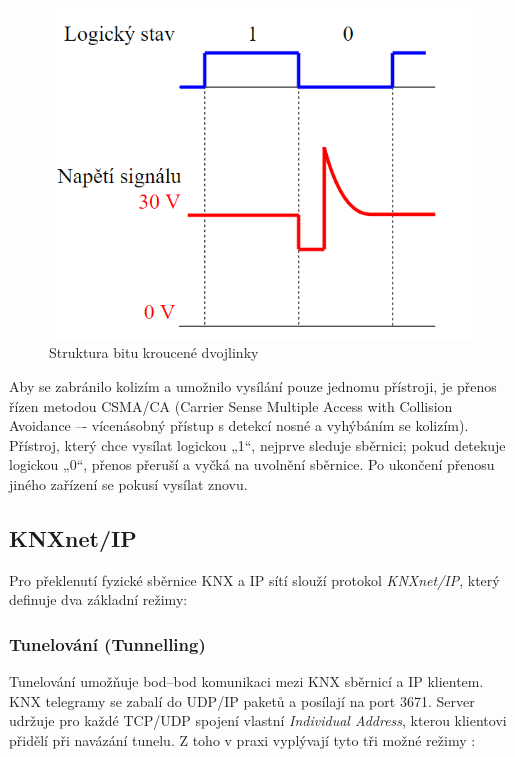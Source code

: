 \begin{figure}[!h]
  \begin{center}
    \includegraphics[scale=0.7]{obrazky/Struktura bitu.png}
  \end{center}
  \caption[Struktura bitu kroucené dvojlinky \cite{Celkovy prehled}]{Struktura bitu kroucené dvojlinky \cite{Celkovy prehled}}
  \label{fig:Struktura bitu kroucené dvojlinky}
\end{figure}

Aby se zabránilo kolizím a umožnilo vysílání pouze jednomu přístroji, je přenos řízen metodou CSMA/CA (Carrier Sense Multiple Access with Collision Avoidance –- vícenásobný přístup s detekcí nosné a vyhýbáním se kolizím). Přístroj, který chce vysílat logickou „1“, nejprve sleduje sběrnici; pokud detekuje logickou „0“, přenos přeruší a vyčká na uvolnění sběrnice. Po ukončení přenosu jiného zařízení se pokusí vysílat znovu. \cite{Celkovy prehled}
\subsection{KNXnet/IP}
\label{KNXnet/IP}

Pro překlenutí fyzické sběrnice KNX a IP sítí slouží protokol \emph{KNXnet/IP}, který definuje dva základní režimy:

\subsubsection{Tunelování (Tunnelling)}  
Tunelování umožňuje bod–bod komunikaci mezi KNX sběrnicí a IP klientem. KNX telegramy se zabalí do UDP/IP paketů a posílají na port 3671. Server udržuje pro každé TCP/UDP spojení vlastní \textit{Individual Address}, kterou klientovi přidělí při navázání tunelu. Z toho v praxi vyplývají tyto tři možné režimy \cite{KNXTunnel}:

